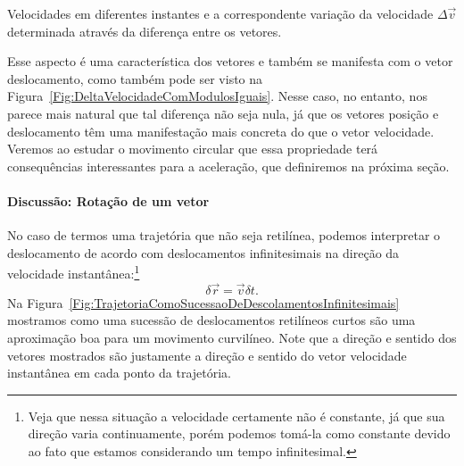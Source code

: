 \begin{marginfigure}
   \caption{Velocidades em diferentes instantes e a correspondente variação da velocidade $\Delta\vec{v}$ determinada através da diferença entre os vetores. \label{Fig:DeltaVelocidadeComModulosIguais}}
\end{marginfigure}

Esse aspecto é uma característica dos vetores e também se manifesta com o vetor deslocamento, como também pode ser visto na Figura~\ref{Fig:DeltaVelocidadeComModulosIguais}. Nesse caso, no entanto, nos parece mais natural que tal diferença não seja nula, já que os vetores posição e deslocamento têm uma manifestação mais concreta do que o vetor velocidade. Veremos ao estudar o movimento circular que essa propriedade terá consequências interessantes para a aceleração, que definiremos na próxima seção.

\paragraph{Discussão: Rotação de um vetor}
\label{Disc:RotVetor}

No caso de termos uma trajetória que não seja retilínea, podemos interpretar o deslocamento de acordo com deslocamentos infinitesimais na direção da velocidade instantânea:\footnote[][-1cm]{Veja que nessa situação a velocidade certamente não é constante, já que sua direção varia continuamente, porém podemos tomá-la como constante devido ao fato que estamos considerando um tempo infinitesimal.}
\begin{equation}
	\delta \vec{r} = \vec{v} \delta t.
\end{equation}
%
Na Figura~\ref{Fig:TrajetoriaComoSucessaoDeDescolamentosInfinitesimais} mostramos como uma sucessão de deslocamentos retilíneos curtos são uma aproximação boa para um movimento curvilíneo. Note que a direção e sentido dos vetores mostrados são justamente a direção e sentido do vetor velocidade instantânea em cada ponto da trajetória.

